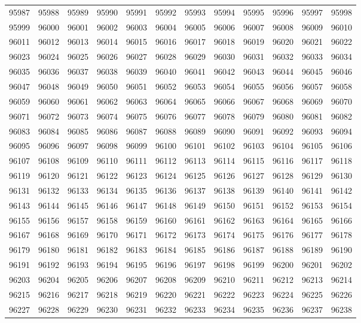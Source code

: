 \begin{center}
\begin{longtable}{llllllllllll}
95987 &95988 &95989 &95990 &95991 &95992 &95993 &95994 &95995 &95996 &95997 &95998 \\
95999 &96000 &96001 &96002 &96003 &96004 &96005 &96006 &96007 &96008 &96009 &96010 \\
96011 &96012 &96013 &96014 &96015 &96016 &96017 &96018 &96019 &96020 &96021 &96022 \\
96023 &96024 &96025 &96026 &96027 &96028 &96029 &96030 &96031 &96032 &96033 &96034 \\
96035 &96036 &96037 &96038 &96039 &96040 &96041 &96042 &96043 &96044 &96045 &96046 \\
96047 &96048 &96049 &96050 &96051 &96052 &96053 &96054 &96055 &96056 &96057 &96058 \\
96059 &96060 &96061 &96062 &96063 &96064 &96065 &96066 &96067 &96068 &96069 &96070 \\
96071 &96072 &96073 &96074 &96075 &96076 &96077 &96078 &96079 &96080 &96081 &96082 \\
96083 &96084 &96085 &96086 &96087 &96088 &96089 &96090 &96091 &96092 &96093 &96094 \\
96095 &96096 &96097 &96098 &96099 &96100 &96101 &96102 &96103 &96104 &96105 &96106 \\
96107 &96108 &96109 &96110 &96111 &96112 &96113 &96114 &96115 &96116 &96117 &96118 \\
96119 &96120 &96121 &96122 &96123 &96124 &96125 &96126 &96127 &96128 &96129 &96130 \\
96131 &96132 &96133 &96134 &96135 &96136 &96137 &96138 &96139 &96140 &96141 &96142 \\
96143 &96144 &96145 &96146 &96147 &96148 &96149 &96150 &96151 &96152 &96153 &96154 \\
96155 &96156 &96157 &96158 &96159 &96160 &96161 &96162 &96163 &96164 &96165 &96166 \\
96167 &96168 &96169 &96170 &96171 &96172 &96173 &96174 &96175 &96176 &96177 &96178 \\
96179 &96180 &96181 &96182 &96183 &96184 &96185 &96186 &96187 &96188 &96189 &96190 \\
96191 &96192 &96193 &96194 &96195 &96196 &96197 &96198 &96199 &96200 &96201 &96202 \\
96203 &96204 &96205 &96206 &96207 &96208 &96209 &96210 &96211 &96212 &96213 &96214 \\
96215 &96216 &96217 &96218 &96219 &96220 &96221 &96222 &96223 &96224 &96225 &96226 \\
96227 &96228 &96229 &96230 &96231 &96232 &96233 &96234 &96235 &96236 &96237 &96238 \\

\end{longtable}
\end{center}
